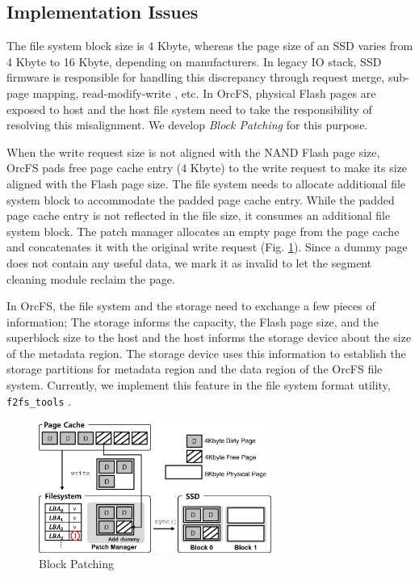 \documentclass[prodmode,acmtecs]{acmsmall}
\begin{document}
\subsection{Implementation Issues}
\label{subsec:OrcFS_implementation}



The file system block size is 4 Kbyte, whereas the page size of an SSD
varies from 4 Kbyte to 16 Kbyte, depending on manufacturers.  In
legacy IO stack, SSD firmware is responsible for handling this
discrepancy through request merge, sub-page mapping, read-modify-write
\cite{agrawal2008design}, etc. In OrcFS, physical Flash pages are
exposed to host and the host file system need to take the
responsibility of resolving this misalignment. We develop \emph{Block
  Patching} for this purpose.

When the write request size is not aligned with the NAND Flash page
size, OrcFS pads free page cache entry (4 Kbyte) to the write request
to make its size aligned with the Flash page size. The file system
needs to allocate additional file system block to accommodate the
padded page cache entry. While the padded page cache entry is not
reflected in the file size, it consumes an additional file system
block.  The patch manager allocates an empty page from the page cache and
concatenates it with the original write request
(Fig. \ref{fig:patch_manager}).  Since a dummy page does not contain
any useful data, we mark it as invalid to let the segment cleaning
module reclaim the page.

In OrcFS, the file system and the storage need to exchange a few
pieces of information; The storage informs the capacity, the Flash page 
size, and the superblock size to the host and the host informs the
storage device about the size of the metadata region. The storage device
uses this information to establish the storage partitions for metadata
region and the data region of the OrcFS file system. Currently, we
implement this feature in the file system format utility,
\texttt{f2fs\_tools} \cite{f2fs_tools}.


\begin{figure}[t]
\begin{center}
\includegraphics[width=3in]{./figure/patch_manager}
\caption{Block Patching}
\label{fig:patch_manager}
\end{center}
\end{figure}
\end{document}
